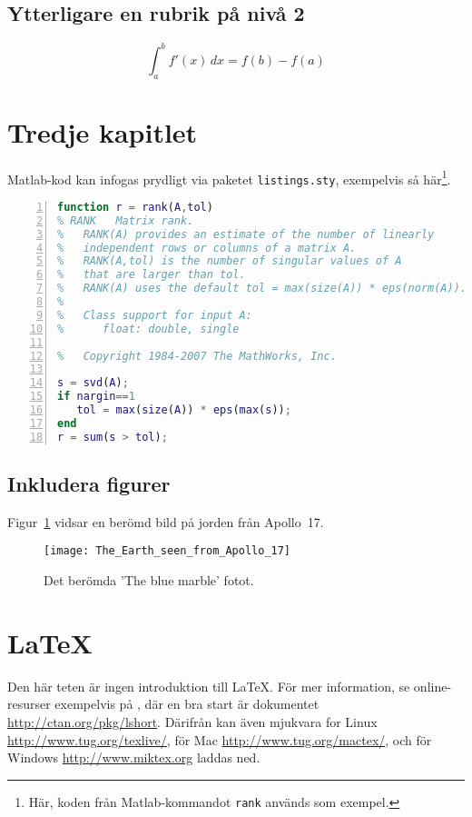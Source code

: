 \documentclass[10pt,oneside,swedish]{lips-no_customer}
\begin{document}
\subsection{Ytterligare en rubrik på nivå 2}
\lipsum[10]

\begin{equation}
  \int_{a}^{b} f'(x)\,dx = f(b)-f(a)
\end{equation}

\section{Tredje kapitlet}
Matlab-kod kan infogas prydligt via paketet \texttt{listings.sty},
exempelvis så här\footnote{Här, koden från Matlab-kommandot
  \texttt{rank} används som exempel.}.
\begin{lstlisting}[language=Matlab,frame=single, numbers=left, stepnumber=2]
function r = rank(A,tol)
% RANK   Matrix rank.
%   RANK(A) provides an estimate of the number of linearly
%   independent rows or columns of a matrix A.
%   RANK(A,tol) is the number of singular values of A
%   that are larger than tol.
%   RANK(A) uses the default tol = max(size(A)) * eps(norm(A)).
%
%   Class support for input A:
%      float: double, single

%   Copyright 1984-2007 The MathWorks, Inc.

s = svd(A);
if nargin==1
   tol = max(size(A)) * eps(max(s));
end
r = sum(s > tol);
\end{lstlisting}

\subsection{Inkludera figurer}
\lipsum[7]

Figur~\ref{fig:bluemarble} vidsar en berömd bild på jorden från Apollo~17.
\begin{figure}[htbp]
  \centering
  \texttt{[image: The\_Earth\_seen\_from\_Apollo\_17]}
  \caption{Det berömda 'The blue marble' fotot.}
  \label{fig:bluemarble}
\end{figure}

\section{\LaTeX{}}
Den här teten är ingen introduktion till \LaTeX{}. För mer
information, se online-resurser exempelvis på \citep{TUG}, där en bra
start är dokumentet \url{http://ctan.org/pkg/lshort}. Därifrån kan
även mjukvara for Linux
\url{http://www.tug.org/texlive/}, för Mac
\url{http://www.tug.org/mactex/}, och för Windows
\url{http://www.miktex.org} laddas ned.
\end{document}
